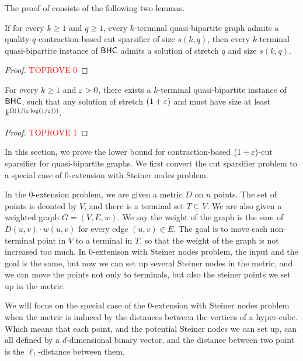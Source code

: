 The proof of  consists of the following two lemmas.

\begin{lemma}
If for every $k\ge 1$ and $q\ge 1$, every $k$-terminal quasi-bipartite graph admits a quality-$q$ contraction-based cut sparsifier of size $s(k,q)$, then every $k$-terminal quasi-bipartite instance of $\textnormal{\textsf{BHC}}$ admits a solution of stretch $q$ and size $s(k,q)$.
\end{lemma}

\begin{proof}\textcolor{red}{TOPROVE 0}\end{proof}

\begin{lemma}
For every $k\ge 1$ and ${\varepsilon}>0$, there exists a $k$-terminal quasi-bipartite instance of $\textnormal{\textsf{BHC}}$, such that any solution of stretch $(1+{\varepsilon})$ and must have size at least $k^{\Omega(1/({\varepsilon}\log (1/{\varepsilon})))}$.
\end{lemma}

\begin{proof}\textcolor{red}{TOPROVE 1}\end{proof}







\iffalse

In this section, we prove the lower bound for contraction-based $(1+{\varepsilon})$-cut sparsifier for quasi-bipartite graphs. We first convert the cut sparsifier problem to a special case of $0$-extension with Steiner nodes problem.

In the 0-extension problem, we are given a metric $D$ on $n$ points. The set of points is deonted by $V$, and there is a terminal set $T \subseteq V$. We are also given a weighted graph $G=(V,E,w)$. We say the weight of the graph is the sum of $D(u,v)\cdot w(u,v)$ for every edge $(u,v)\in E$. The goal is to move each non-terminal point in $V$ to a terminal in $T$, so that the weight of the graph is not increased too much. In 0-extenison with Steiner nodes problem, the input and the goal is the same, but now we can set up several Steiner nodes in the metric, and we can move the points not only to terminals, but also the steiner points we set up in the metric. 

We will focus on the special case of the 0-extension with Steiner nodes problem when the metric is induced by the distances between the vertices of a hyper-cube. Which means that each point, and the potential Steiner nodes we can set up, can all defined by a $d$-dimensional binary vector, and the distance between two point is the $\ell_1$-distance between them.

